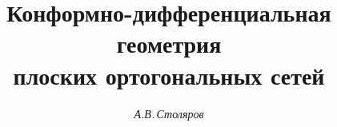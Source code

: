 

 




 


\newcommand{\Mod}{\operatorname{mod}} 


\newcommand{\tts}[1]{} 


 




\setcounter{page}{61} 












 


\author{\it А.В.\,Столяров} 




\title{Конформно-дифференциальная геометрия\\


плоских ортогональных сетей} 


 


\date{} 




\pagestyle{plain} %


 




\maketitle 


\label{begin} 


